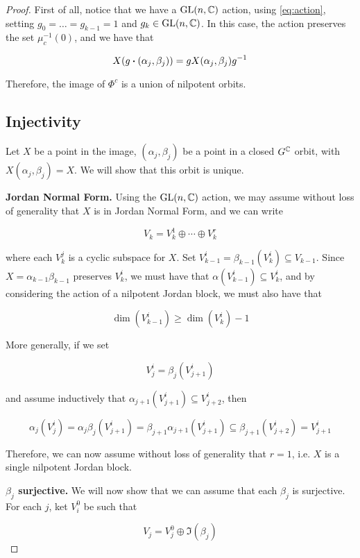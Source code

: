 \documentclass{article}
\begin{document}
\begin{proof}
    First of all, notice that we have a \(\operatorname{GL}(n, \mathbb{C})\) action, using \cref{eq:action}, setting \(g_0 = \dots = g_{k-1} = 1\) and \(g_k \in \operatorname{GL}(n, \mathbb{C})\). In this case, the action preserves the set \(\mu_c^{-1}(0)\), and we have that

    \[X(g \vdot (\alpha_j, \beta_j)) = g X(\alpha_j, \beta_j)g^{-1}\]

    Therefore, the image of \(\Phi^c\) is a union of nilpotent orbits.

    \subsection{Injectivity}
    
    Let \(X\) be a point in the image, \((\alpha_j, \beta_j)\) be a point in a closed \(G^{\mathbb{C}}\) orbit, with \(X(\alpha_j, \beta_j) = X\). We will show that this orbit is unique. 
    
    \textbf{Jordan Normal Form.} Using the \(\operatorname{GL}(n, \mathbb{C})\) action, we may assume without loss of generality that \(X\) is in Jordan Normal Form, and we can write

    \[V_k = V_k^1 \oplus \cdots \oplus V_k^r\]

    where each \(V_k^j\) is a cyclic subspace for \(X\). Set \(V_{k-1}^i = \beta_{k-1}(V_k^i) \subseteq V_{k-1}\). Since \(X = \alpha_{k-1}\beta_{k-1}\) preserves \(V_k^i\), we must have that \(\alpha(V_{k-1}^i) \subseteq V_k^i\), and by considering the action of a nilpotent Jordan block, we must also have that

    \[\dim(V_{k-1}^i) \ge \dim(V_k^i) - 1\]

    More generally, if we set

    \[V_j^i = \beta_j(V_{j+1}^i)\]

    and assume inductively that \(\alpha_{j+1}(V_{j+1}^i)\subseteq V_{j+2}^i\), then

    \[\alpha_j(V_j^i) = \alpha_j\beta_j(V_{j+1}^i) = \beta_{j+1}\alpha_{j+1}(V_{j+1}^i) \subseteq \beta_{j+1}(V_{j+2}^i) = V_{j+1}^i\]

    Therefore, we can now assume without loss of generality that \(r = 1\), i.e. \(X\) is a single nilpotent Jordan block.

    \textbf{\(\beta_j\) surjective.} We will now show that we can assume that each \(\beta_j\) is surjective. For each \(j\), ket \(V_i^0\) be such that

    \[V_j = V_j^0 \oplus \Im(\beta_j)\]


\end{proof}
\end{document}
